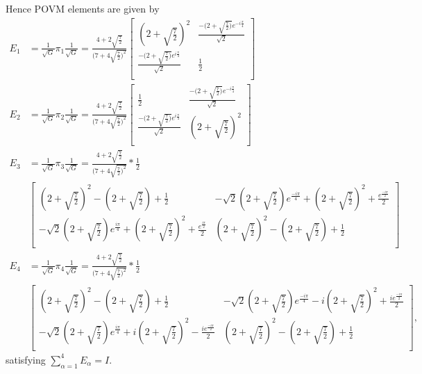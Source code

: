 Hence POVM elements are given by
\begin{align*}
E_{1} & = \frac{1}{\sqrt{G}}\pi_{1}\frac{1}{\sqrt{G}} = \frac{4+2\sqrt{\frac{7}{2}}}{(7+4\sqrt{\frac{7}{2})^{2}}}
\begin{bmatrix}
(2+\sqrt{\frac{7}{2}})^{2} & \frac{-(2+\sqrt{\frac{7}{2})}e^{-i\frac{\pi}{4}}}{\sqrt{2}}  \\ 
\frac{-(2+\sqrt{\frac{7}{2})}e^{i\frac{\pi}{4}}}{\sqrt{2}} & \frac{1}{2}\\ 
\end{bmatrix}\\
E_{2} & = \frac{1}{\sqrt{G}}\pi_{2}\frac{1}{\sqrt{G}} = \frac{4+2\sqrt{\frac{7}{2}}}{(7+4\sqrt{\frac{7}{2})^{2}}}
\begin{bmatrix}
\frac{1}{2} & \frac{-(2+\sqrt{\frac{7}{2})}e^{-i\frac{\pi}{4}}}{\sqrt{2}}\\ 
\frac{-(2+\sqrt{\frac{7}{2})}e^{i\frac{\pi}{4}}}{\sqrt{2}} & (2+\sqrt{\frac{7}{2}})^{2}\\ 
\end{bmatrix}\\
E_{3} & = \frac{1}{\sqrt{G}}\pi_{3}\frac{1}{\sqrt{G}} = \frac{4+2\sqrt{\frac{7}{2}}}{(7+4\sqrt{\frac{7}{2})^{2}}}*\frac{1}{2}\\
&\begin{bmatrix}
(2+\sqrt{\frac{7}{2}})^{2}-(2+\sqrt{\frac{7}{2}})+\frac{1}{2} & -\sqrt{2}(2+\sqrt{\frac{7}{2}})e^{\frac{-i\pi}{4}}+(2+\sqrt{\frac{7}{2}})^{2}+\frac{e^{\frac{-i\pi}{2}}}{2} \\
-\sqrt{2}(2+\sqrt{\frac{7}{2}})e^{\frac{i\pi}{4}}+(2+\sqrt{\frac{7}{2}})^{2}+\frac{e^{\frac{i\pi}{2}}}{2} & (2+\sqrt{\frac{7}{2}})^{2}-(2+\sqrt{\frac{7}{2}})+\frac{1}{2}\\
\end{bmatrix}\\
E_{4} & = \frac{1}{\sqrt{G}}\pi_{4}\frac{1}{\sqrt{G}} = \frac{4+2\sqrt{\frac{7}{2}}}{(7+4\sqrt{\frac{7}{2})^{2}}}*\frac{1}{2}\\
&\begin{bmatrix}
(2+\sqrt{\frac{7}{2}})^{2}-(2+\sqrt{\frac{7}{2}})+\frac{1}{2} & -\sqrt{2}(2+\sqrt{\frac{7}{2}})e^{\frac{-i\pi}{4}}-i(2+\sqrt{\frac{7}{2}})^{2}+\frac{ie^{\frac{-i\pi}{2}}}{2} \\ 
-\sqrt{2}(2+\sqrt{\frac{7}{2}})e^{\frac{i\pi}{4}}+i(2+\sqrt{\frac{7}{2}})^{2}-\frac{ie^{\frac{-i\pi}{2}}}{2} & (2+\sqrt{\frac{7}{2}})^{2}-(2+\sqrt{\frac{7}{2}})+\frac{1}{2}\\
\end{bmatrix},
\end{align*}
satisfying $\sum_{\alpha=1}^{4} E_{\alpha}= I$.


